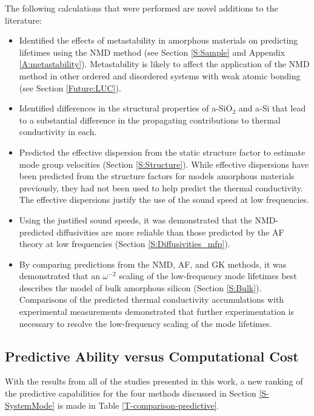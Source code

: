 The following calculations that were performed are novel additions 
to the literature:
\begin{itemize}
\item Identified the effects of metastability in amorphous materials 
on predicting lifetimes using the NMD method 
(see Section \ref{S:Sample} and Appendix \ref{A:metastability}). 
Metastability is likely to affect the application of the NMD method 
in other ordered and disordered systems with weak atomic bonding 
(see Section \ref{Future:LUC}). 
\item Identified differences in the structural properties of 
a-SiO$_2$ and a-Si that lead to a substantial difference in the 
propagating contributions to thermal conductivity in each. 
\item Predicted the effective dispersion from the static structure factor 
to estimate mode group velocities (Section \ref{S:Structure}). 
While effective dispersions have been predicted from the structure factors 
for models amorphous materials previously, they had not been used to help  
predict the thermal conductivity. The effective dispersions 
justify the use of the sound speed at low frequencies. 
\item Using the justified sound speeds, 
it was demonstrated that the NMD-predicted diffusivities are more 
reliable than those predicted by the AF theory at low frequencies 
(Section \ref{S:Diffusivities_mfp}).
\item By comparing predictions from the NMD, AF, and GK methods, it was 
demonstrated that an $\omega^{-2}$ scaling of the low-frequency mode 
lifetimes best describes the model of bulk amorphous silicon 
(Section \ref{S:Bulk}). Comparisons of the predicted thermal conductivity 
accumulations with experimental measurements demonstrated that further 
experimentation is necessary to resolve the low-frequency scaling of the mode 
lifetimes.  
\end{itemize}

\subsection{\label{S:Predictive}
Predictive Ability versus Computational Cost}

With the results from all of the studies presented in this work, 
a new ranking of the predictive capabilities for the four methods 
discussed in Section \ref{S-SystemMode} is made in Table 
\ref{T-comparison-predictive}. 

